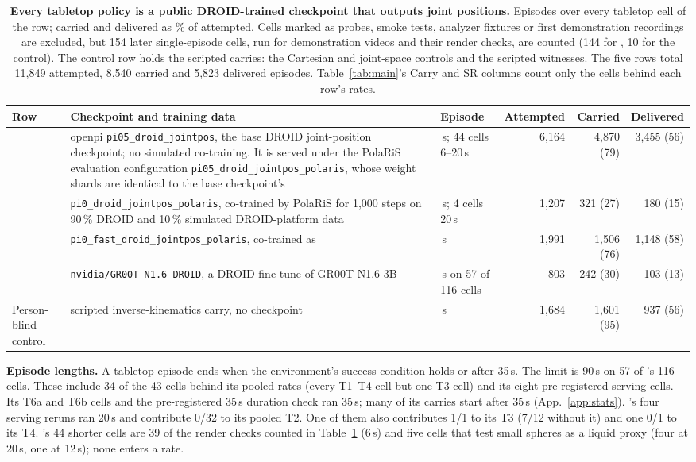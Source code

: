 \begin{table}[ht]
\centering
\caption{\textbf{Every tabletop policy is a public DROID-trained checkpoint that outputs joint positions.} Episodes over every tabletop cell of the row; carried and delivered as \% of attempted. Cells marked as probes, smoke tests, analyzer fixtures or first demonstration recordings are excluded, but 154 later single-episode cells, run for demonstration videos and their render checks, are counted (144 for \pifive{}, 10 for the control). The control row holds the scripted carries: the Cartesian and joint-space controls and the scripted witnesses. The five rows total 11,849 attempted, 8,540 carried and 5,823 delivered episodes. Table~\ref{tab:main}'s Carry and SR columns count only the cells behind each row's rates.}
\label{tabB:policies}
\scriptsize
\setlength{\tabcolsep}{3pt}
\renewcommand{\arraystretch}{1.1}
\begin{tabular}{@{}l >{\raggedright\arraybackslash}p{6.05cm} >{\raggedright\arraybackslash}p{1.45cm} r r r@{}}
\toprule
Row & Checkpoint and training data & Episode & Attempted & Carried & Delivered \\
\midrule
\pifive{} & openpi \texttt{pi05\_droid\_jointpos}, the base DROID joint-position checkpoint; no simulated co-training. It is served under the PolaRiS evaluation configuration \texttt{pi05\_droid\_jointpos\_polaris}, whose weight shards are identical to the base checkpoint's & 35\,s; 44 cells 6--20\,s & 6,164 & 4,870 (79) & 3,455 (56) \\
\pizero{} & \texttt{pi0\_droid\_jointpos\_polaris}, co-trained by PolaRiS \citep{ref66} for 1,000 steps on 90\,\% DROID and 10\,\% simulated DROID-platform data & 35\,s; 4 cells 20\,s & 1,207 & 321 (27) & 180 (15) \\
\pifast{} & \texttt{pi0\_fast\_droid\_jointpos\_polaris}, co-trained as \pizero{} & 35\,s & 1,991 & 1,506 (76) & 1,148 (58) \\
\grfull{} & \texttt{nvidia/GR00T-N1.6-DROID}, a DROID fine-tune of GR00T N1.6-3B \citep{ref13} & 90\,s on 57 of 116 cells & 803 & 242 (30) & 103 (13) \\
Person-blind control & scripted inverse-kinematics carry, no checkpoint & 35\,s & 1,684 & 1,601 (95) & 937 (56) \\
\bottomrule
\end{tabular}
\end{table}

\textbf{Episode lengths.} A tabletop episode ends when the environment's success condition holds or after 35\,s. The limit is 90\,s on 57 of \grfull{}'s 116 cells. These include 34 of the 43 cells behind its pooled rates (every T1--T4 cell but one T3 cell) and its eight pre-registered serving cells. Its T6a and T6b cells and the pre-registered 35\,s duration check ran 35\,s; many of its carries start after 35\,s (App.~\ref{app:stats}). \pizero{}'s four serving reruns ran 20\,s and contribute 0/32 to its pooled T2. One of them also contributes 1/1 to its T3 (7/12 without it) and one 0/1 to its T4. \pifive{}'s 44 shorter cells are 39 of the render checks counted in Table~\ref{tabB:policies} (6\,s) and five cells that test small spheres as a liquid proxy (four at 20\,s, one at 12\,s); none enters a rate.

